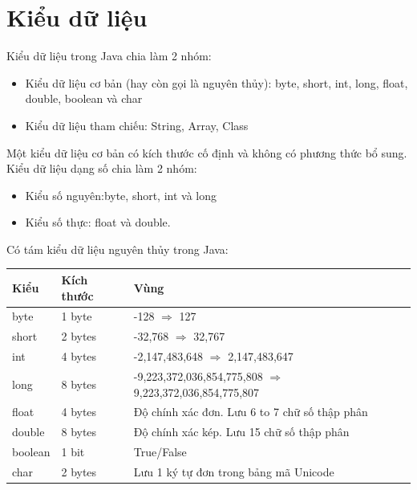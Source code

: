 \section{Kiểu dữ liệu}
\indent Kiểu dữ liệu trong Java chia làm 2 nhóm:
\begin{itemize}
\item Kiểu dữ liệu cơ bản (hay còn gọi là nguyên thủy): {\ttfamily byte, short, int, long, float, double, boolean và char}
\item Kiểu dữ liệu tham chiếu: {\ttfamily String, Array, Class}
\end{itemize}
\indent Một kiểu dữ liệu cơ bản có kích thước cố định và không có phương thức bổ sung. Kiểu dữ liệu dạng số chia làm 2 nhóm:\\
\begin{itemize}
\item Kiểu số nguyên:{\ttfamily byte, short, int và long}
\item Kiểu số thực: {\ttfamily float và double}.
\end{itemize}
\indent Có tám kiểu dữ liệu nguyên thủy trong Java:\\
\begin{tabular}{ lll}
\hline
Kiểu&Kích thước&Vùng\\
\hline
byte&1 byte&-128 $\Rightarrow$ 127\\
\hline
short&2 bytes&-32,768 $\Rightarrow$ 32,767\\
\hline
int&4 bytes&-2,147,483,648 $\Rightarrow$ 2,147,483,647\\
\hline
long&8 bytes&-9,223,372,036,854,775,808 $\Rightarrow$ 9,223,372,036,854,775,807\\
\hline
float&4 bytes&Độ chính xác đơn. Lưu 6 to 7 chữ số thập phân\\
\hline
double&8 bytes&Độ chính xác kép. Lưu 15 chữ số thập phân\\
\hline
boolean&1 bit&True/False\\
\hline
char&2 bytes&Lưu 1 ký tự đơn trong bảng mã Unicode\\
\hline
\end{tabular}
